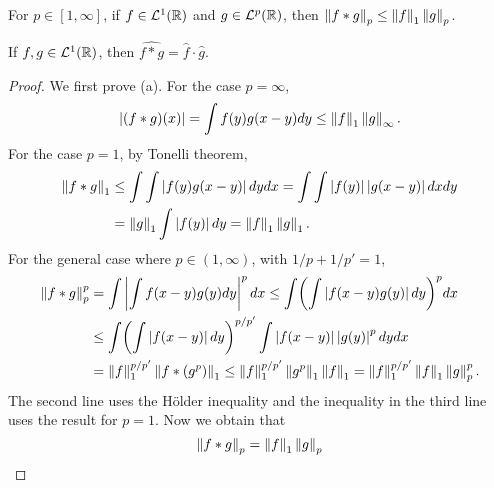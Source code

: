 \begin{theorem}\phantom{.}\vspace{-1.5em}
    \begin{thmenum}
        \item For $p\in[1,\infty]$, if $f\in\mathcal{L}^1(\mathbb{R})$ and $g\in\mathcal{L}^p(\mathbb{R})$, then 
        $\left\lVert {f*g} \right\rVert_p \leq \left\lVert {f} \right\rVert_1\left\lVert {g} \right\rVert_p$. 
        \item If $f,g\in\mathcal{L}^1(\mathbb{R})$, then $\widehat{f*g} = \hat{f}\cdot\hat{g}$.
    \end{thmenum}
\end{theorem}
\begin{proof}
    We first prove (a). For the case $p=\infty$, 
    \begin{equation*}
        \left\lvert {(f*g)(x)} \right\rvert = \int f(y)g(x-y)dy \leq \left\lVert {f} \right\rVert_1\left\lVert {g} \right\rVert_\infty.
    \end{equation*} 
    For the case $p=1$, by Tonelli theorem,
    \begin{equation*}
        \begin{split}
            \left\lVert {f*g} \right\rVert_1 &\leq \int\int \left\lvert {f(y)g(x-y)} \right\rvert dydx = \int\int\left\lvert {f(y)} \right\rvert\left\lvert {g(x-y)} \right\rvert dxdy \\
            &= \left\lVert {g} \right\rVert_1\int \left\lvert {f(y)} \right\rvert dy = \left\lVert {f} \right\rVert_1\left\lVert {g} \right\rVert_1.
        \end{split}
    \end{equation*}
    For the general case where $p\in(1,\infty)$, with $1/p + 1/p' = 1$, 
    \begin{equation*}
        \begin{split}
            \norm{f*g}_p^p &= \int\abs{\int f(x-y)g(y)dy}^pdx \leq \int\pth{\int \abs{f(x-y)g(y)}dy}^pdx \\ 
            &\leq \int\pth{\int\abs{f(x-y)}dy}^{p/p'}\int \abs{f(x-y)}\abs{g(y)}^pdydx \\
            &= \norm{f}_1^{p/p'}\norm{f*(g^p)}_1 \leq \norm{f}_1^{p/p'}\norm{g^p}_1\norm{f}_1 
            = \norm{f}_1^{p/p'}\norm{f}_1\norm{g}_p^p. 
        \end{split}
    \end{equation*}
    The second line uses the H\"older inequality and the inequality in the 
    third line uses the result for $p=1$. Now we obtain that 
    \begin{equation*}
        \left\lVert {f*g} \right\rVert_p = \left\lVert {f} \right\rVert_1\left\lVert {g} \right\rVert_p
    \end{equation*}
    

\end{proof}
